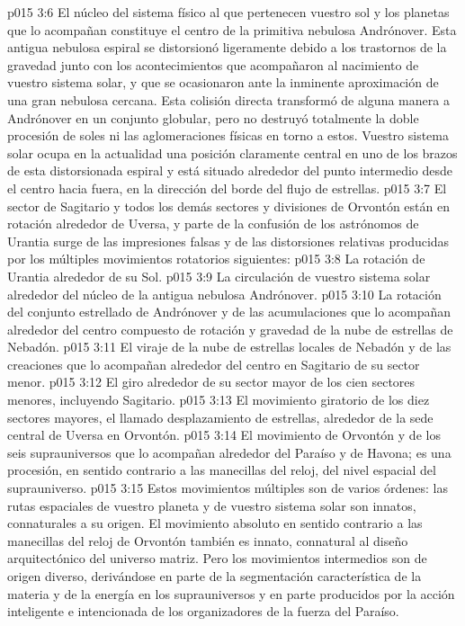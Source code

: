 \vs p015 3:6 El núcleo del sistema físico al que pertenecen vuestro sol y los planetas que lo acompañan constituye el centro de la primitiva nebulosa Andrónover. Esta antigua nebulosa espiral se distorsionó ligeramente debido a los trastornos de la gravedad junto con los acontecimientos que acompañaron al nacimiento de vuestro sistema solar, y que se ocasionaron ante la inminente aproximación de una gran nebulosa cercana. Esta colisión directa transformó de alguna manera a Andrónover en un conjunto globular, pero no destruyó totalmente la doble procesión de soles ni las aglomeraciones físicas en torno a estos. Vuestro sistema solar ocupa en la actualidad una posición claramente central en uno de los brazos de esta distorsionada espiral y está situado alrededor del punto intermedio desde el centro hacia fuera, en la dirección del borde del flujo de estrellas.
\vs p015 3:7 \pc El sector de Sagitario y todos los demás sectores y divisiones de Orvontón están en rotación alrededor de Uversa, y parte de la confusión de los astrónomos de Urantia surge de las impresiones falsas y de las distorsiones relativas producidas por los múltiples movimientos rotatorios siguientes:
\vs p015 3:8 La rotación de Urantia alrededor de su Sol.
\vs p015 3:9 La circulación de vuestro sistema solar alrededor del núcleo de la antigua nebulosa Andrónover.
\vs p015 3:10 La rotación del conjunto estrellado de Andrónover y de las acumulaciones que lo acompañan alrededor del centro compuesto de rotación y gravedad de la nube de estrellas de Nebadón.
\vs p015 3:11 El viraje de la nube de estrellas locales de Nebadón y de las creaciones que lo acompañan alrededor del centro en Sagitario de su sector menor.
\vs p015 3:12 El giro alrededor de su sector mayor de los cien sectores menores, incluyendo Sagitario.
\vs p015 3:13 El movimiento giratorio de los diez sectores mayores, el llamado desplazamiento de estrellas, alrededor de la sede central de Uversa en Orvontón.
\vs p015 3:14 El movimiento de Orvontón y de los seis suprauniversos que lo acompañan alrededor del Paraíso y de Havona; es una procesión, en sentido contrario a las manecillas del reloj, del nivel espacial del suprauniverso.
\vs p015 3:15 \pc Estos movimientos múltiples son de varios órdenes: las rutas espaciales de vuestro planeta y de vuestro sistema solar son innatos, connaturales a su origen. El movimiento absoluto en sentido contrario a las manecillas del reloj de Orvontón también es innato, connatural al diseño arquitectónico del universo matriz. Pero los movimientos intermedios son de origen diverso, derivándose en parte de la segmentación característica de la materia y de la energía en los suprauniversos y en parte producidos por la acción inteligente e intencionada de los organizadores de la fuerza del Paraíso.
